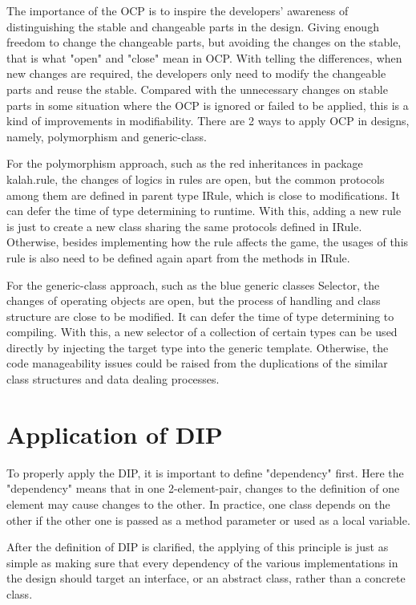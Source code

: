 \documentclass[conference]{IEEEtran}
\begin{document}
The importance of the \gls{OCP} is to inspire the developers' awareness of distinguishing the stable and changeable parts in the design. Giving enough freedom to change the changeable parts, but avoiding the changes on the stable, that is what "open" and "close" mean in \gls{OCP}.  With telling the differences, when new changes are required, the developers only need to modify the changeable parts and reuse the stable. Compared with the unnecessary changes on stable parts in some situation where the \gls{OCP} is ignored or failed to be applied, this is a kind of improvements in modifiability. There are 2 ways to apply \gls{OCP} in designs, namely, polymorphism and generic-class.\cite{1}

For the polymorphism approach, such as the red inheritances in package kalah.rule, the changes of logics in rules are open, but the common protocols among them are defined in parent type IRule, which is close to modifications. It can defer the time of type determining to runtime. With this, adding a new rule is just to create a new class sharing the same protocols defined in IRule. Otherwise, besides implementing how the rule affects the game, the usages of this rule is also need to be defined again apart from the methods in IRule. 

For the generic-class approach, such as the blue generic classes Selector, the changes of operating objects are open, but the process of handling and class structure are close to be modified. It can defer the time of type determining to compiling. With this, a new selector of a collection of certain types can be used directly by injecting the target type into the generic template. Otherwise, the code manageability issues could be raised from the duplications of the similar class structures and data dealing processes.

\section{Application of \gls{DIP}}
To properly apply the \gls{DIP}, it is important to define "dependency" first. Here the "dependency" means that in one 2-element-pair, changes to the definition of one element may cause changes to the other.\cite{1} In practice, one class depends on the other if the other one is passed as a method parameter or used as a local variable.

After the definition of \gls{DIP} is clarified, the applying of this principle is just as simple as making sure that every dependency of the various implementations in the design should target an interface, or an abstract class, rather than a concrete class.
\end{document}
